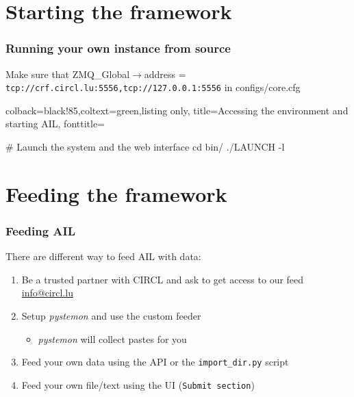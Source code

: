 \documentclass{beamer}
\begin{document}
\section{Starting the framework}
\lstset{style=bash}
\begin{frame}[fragile]
    \frametitle{Running your own instance from source}
    {\scriptsize Make sure that ZMQ\_Global$\rightarrow$address = \texttt{tcp://crf.circl.lu:5556,tcp://127.0.0.1:5556} in configs/core.cfg}
    \begin{tcblisting}{colback=black!85,coltext=green,listing only,
        title=Accessing the environment and starting AIL, fonttitle=\bfseries}

# Launch the system and the web interface
cd bin/
./LAUNCH -l

\end{tcblisting}
\end{frame}


\section{Feeding the framework}
\begin{frame}
\frametitle{Feeding AIL}
    There are different way to feed AIL with data:
    \begin{enumerate}
        \item Be a trusted partner with CIRCL and ask to get access to our feed {\tiny \href{mailto:info@circl.lu}{info@circl.lu}}
        \item Setup \textit{pystemon} and use the custom feeder
            \begin{itemize}
                \item \textit{pystemon} will collect pastes for you
            \end{itemize}
        \item Feed your own data using the API or the \texttt{import\_dir.py} script
        \item Feed your own file/text using the UI (\texttt{Submit section})
    \end{enumerate}
\end{frame}
\end{document}
